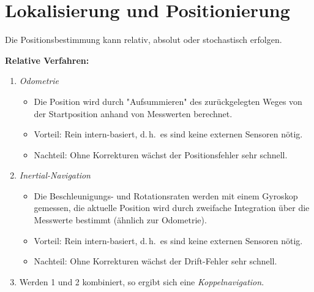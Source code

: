 \documentclass[a4paper, 11pt, accentcolor = tud3b]{tudreport}
\renewcommand{\dh}{d.\,h.~}
\begin{document}
		\section{Lokalisierung und Positionierung}
			Die Positionsbestimmung kann relativ, absolut oder stochastisch erfolgen.
			
			\textbf{Relative Verfahren:}
			\begin{enumerate}
				\item \emph{Odometrie}
					\begin{itemize}
						\item Die Position wird durch "Aufsummieren" des zurückgelegten Weges von der Startposition anhand von Messwerten berechnet.
						\item Vorteil: Rein intern-basiert, \dh es sind keine externen Sensoren nötig.
						\item Nachteil: Ohne Korrekturen wächst der Positionsfehler sehr schnell.
					\end{itemize}
				\item \emph{Inertial-Navigation}
					\begin{itemize}
						\item Die Beschleunigungs- und Rotationsraten werden mit einem Gyroskop gemessen, die aktuelle Position wird durch zweifache Integration über die Messwerte bestimmt (ähnlich zur Odometrie).
						\item Vorteil: Rein intern-basiert, \dh es sind keine externen Sensoren nötig.
						\item Nachteil: Ohne Korrekturen wächst der Drift-Fehler sehr schnell.
					\end{itemize}
				\item[] Werden 1 und 2 kombiniert, so ergibt sich eine \emph{Koppelnavigation}.
			\end{enumerate}
		
\end{document}

